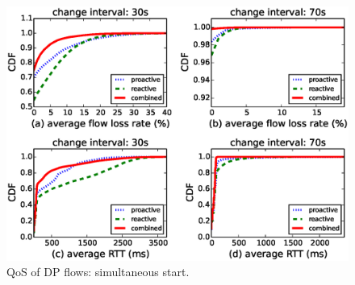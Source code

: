 \begin{figure}[!h]
        \centering
        \includegraphics[width=\columnwidth]{chap-scalims/figure/syn-lossrate-rtt.eps}
        \caption{QoS of DP flows: simultaneous start.}
        \label{fig:syn-lossrate-rtt}
\end{figure}

